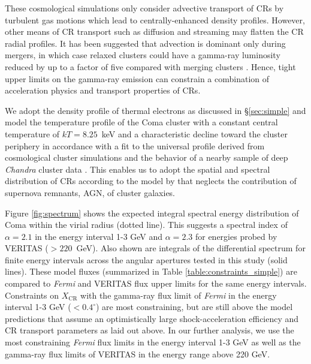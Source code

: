 \documentclass[12pt,manuscript]{aastex}
\def\Fermi{{\em Fermi}\xspace}
\newcommand{\CR}{\mathrm{CR}}
\begin{document}
These cosmological simulations only consider advective transport of CRs by turbulent gas motions
which lead to centrally-enhanced density profiles. However, other means of CR transport such as
diffusion and streaming may flatten the CR radial profiles. It has been suggested that advection is
dominant only during mergers, in which case relaxed clusters could have a gamma-ray luminosity 
reduced by up to a factor of five compared with merging clusters
\citep{article:EnsslinPfrommerMiniatiSubramanian:2011}. Hence, tight upper limits on the gamma-ray
emission can constrain a combination of acceleration physics and transport properties of CRs.

We adopt the density profile of thermal electrons as discussed in \S \ref{sec:simple} and model the
temperature profile
of the Coma cluster with a constant central temperature of $kT= 8.25$~keV and a characteristic
decline toward the cluster periphery in accordance with a fit to the universal profile derived from
cosmological cluster simulations \citep{article:PinzkePfrommer:2010, article:Pfrommer_etal:2007}
and the behavior of a nearby sample of deep {\em Chandra} cluster data
\citep{article:Vikhlinin_etal:2005}. This enables us to adopt the spatial and spectral distribution
of CRs according to the model by \citet{article:PinzkePfrommer:2010} that neglects the contribution of supernova remnants, AGN,
of cluster galaxies.

Figure \ref{fig:spectrum} shows the expected integral spectral energy distribution of Coma within
the virial radius (dotted line). This suggests a spectral index of $\alpha=2.1$ in the energy
interval 1-3 GeV and $\alpha=2.3$ for energies probed by VERITAS ($>220$~GeV). Also
shown are integrals of the differential spectrum for finite energy intervals across the angular
apertures tested in this study (solid lines). These model fluxes (summarized in Table
\ref{table:constraints_simple}) are compared to \Fermi and VERITAS flux upper limits for the same
energy intervals. Constraints on $X_\CR$ with the gamma-ray flux limit of \Fermi in the energy
interval 1-3 GeV ($<0.4^\circ$) are most constraining, but are still above the model predictions
that assume an optimistically large shock-acceleration efficiency and CR transport parameters as
laid out above. In our further analysis, we use the most constraining \Fermi flux limits in the
energy interval 1-3 GeV as well as the gamma-ray flux limits of VERITAS in the energy range above
220 GeV.
\end{document}
